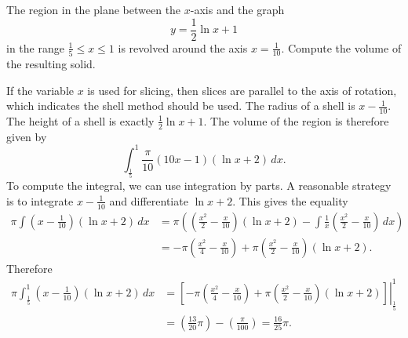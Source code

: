 \documentclass{ximera}
\begin{document}
\begin{question}%

The region in the plane between the  \(x\)-axis and the graph
\[ y = \frac{1}{2} \ln{x} + 1 \]
 in the range \(\frac{1}{5} \leq x \leq 1\) is revolved around the axis \(x = \frac{1}{10}\). Compute the volume of the resulting solid.
\begin{multiplechoice}
\end{multiplechoice}
\begin{feedback}
If the variable \(x\) is used for slicing, then slices are parallel to the axis of rotation, which indicates the shell method should be used.
The radius of a shell is \(x - \frac{1}{10}\). The height of a shell is exactly \(\frac{1}{2} \ln{x} + 1\).
The volume of the region is therefore given by
\[ \int_{\frac{1}{5}}^{1} \frac{\pi}{10} \left(10 x - 1\right) \left(\ln{x} + 2\right)\, dx. \]
 To compute the integral, we can use integration by parts. A reasonable strategy is to integrate  \(x - \frac{1}{10}\) and differentiate  \(\ln{x} + 2\).
 This gives the equality
\[ \begin{aligned} \pi \int \left(x - \frac{1}{10}\right) \left(\ln{x} + 2\right)\, dx & = \pi \left(\left(\frac{x^{2}}{2} - \frac{x}{10}\right) \left(\ln{x} + 2\right) - \int \frac{1}{x} \left(\frac{x^{2}}{2} - \frac{x}{10}\right)\, dx\right) \\
 & = - \pi \left(\frac{x^{2}}{4} - \frac{x}{10}\right) + \pi \left(\frac{x^{2}}{2} - \frac{x}{10}\right) \left(\ln{x} + 2\right). \end{aligned} \]
Therefore 
\[ \begin{aligned} \pi \int_{\frac{1}{5}}^{1} \left(x - \frac{1}{10}\right) \left(\ln{x} + 2\right)\, dx & = \left. \left[- \pi \left(\frac{x^{2}}{4} - \frac{x}{10}\right) + \pi \left(\frac{x^{2}}{2} - \frac{x}{10}\right) \left(\ln{x} + 2\right) \right] \right|_{\frac{1}{5}}^{1}\\ & = \left(\frac{13}{20} \pi \right) - \left(\frac{\pi}{100} \right) = \frac{16}{25} \pi. \end{aligned} \]
\end{feedback}

\end{question}
\end{document}
